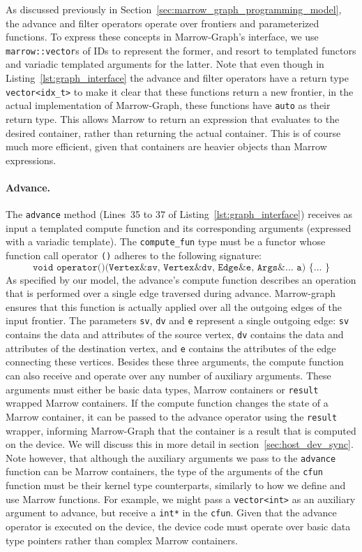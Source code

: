 As discussed previously in Section~\ref{sec:marrow_graph_programming_model}, the advance and filter operators operate over frontiers and parameterized functions. To express these concepts in Marrow-Graph's interface, we use \texttt{marrow::vector}s of IDs to represent the former, and resort to templated functors and variadic templated arguments for the latter. Note that even though in Listing~\ref{lst:graph_interface} the advance and filter operators have a return type \texttt{vector<idx\_t>} to make it clear that these functions return a new frontier, in the actual implementation of Marrow-Graph, these functions have \texttt{auto} as their return type. This allows Marrow to return an expression that evaluates to the desired container, rather than returning the actual container. This is of course much more efficient, given that containers are heavier objects than Marrow expressions.

\paragraph{\textbf{Advance}.}
The \texttt{advance} method (Lines~35 to 37 of Listing~\ref{lst:graph_interface}) receives as input a templated compute function and its corresponding arguments (expressed with a variadic template). The \texttt{compute\_fun} type must be a functor whose function call operator \texttt{()} adheres to the following signature: \[\texttt{void operator()(Vertex\& sv, Vertex\& dv, Edge\& e, Args\&... a) \{ ... \}}\] As specified by our model, the advance's compute function describes an operation that is performed over a single 
edge traversed during advance. Marrow-graph ensures that this function is actually applied over all the outgoing edges of the input frontier. The parameters \texttt{sv}, \texttt{dv} and \texttt{e} represent a single outgoing edge: \texttt{sv} contains the data and attributes of the source vertex, \texttt{dv} contains the data and attributes of the destination vertex, and \texttt{e} contains the attributes of the edge connecting these vertices. Besides these three arguments, the compute function can also receive and operate over any number of auxiliary arguments. These arguments must either be basic data types, Marrow containers or \texttt{result} wrapped Marrow containers. If the compute function changes the state of a Marrow container, it can be passed to the advance operator using the \texttt{result} wrapper, informing Marrow-Graph that the container is a result that is computed on the device. We will discuss this in more detail in section~\ref{sec:host_dev_sync}. Note however, that although the auxiliary arguments we pass to the \texttt{advance} function can be Marrow containers, the type of the arguments of the \texttt{cfun} function must be their kernel type counterparts, similarly to how we define and use Marrow functions. For example, we might pass a \texttt{vector<int>} as an auxiliary argument to advance, but receive a \texttt{int*} in the \texttt{cfun}. Given that the advance operator is executed on the device, the device code must operate over basic data type pointers rather than complex Marrow containers.

